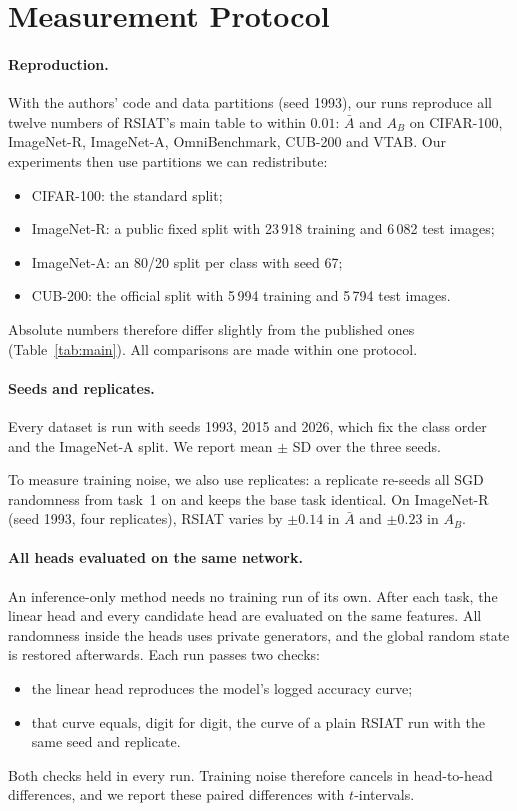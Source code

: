 \section{Measurement Protocol}
\label{sec:protocol}

\paragraph{Reproduction.}
With the authors' code and data partitions (seed 1993), our runs reproduce
all twelve numbers of RSIAT's main table to within $0.01$: $\bar A$ and $A_B$
on CIFAR-100, ImageNet-R, ImageNet-A, OmniBenchmark, CUB-200 and VTAB.
Our experiments then use partitions we can redistribute:
\begin{itemize}
  \item CIFAR-100: the standard split;
  \item ImageNet-R: a public fixed split with 23\,918 training and 6\,082 test images;
  \item ImageNet-A: an 80/20 split per class with seed 67;
  \item CUB-200: the official split with 5\,994 training and 5\,794 test images.
\end{itemize}
Absolute numbers therefore differ slightly from the published ones
(Table~\ref{tab:main}). All comparisons are made within one protocol.

\paragraph{Seeds and replicates.}
Every dataset is run with seeds 1993, 2015 and 2026, which fix the class order
and the ImageNet-A split. We report mean $\pm$ SD over the three seeds.

To measure training noise, we also use replicates: a replicate re-seeds all
SGD randomness from task~1 on and keeps the base task identical. On
ImageNet-R (seed 1993, four replicates), RSIAT varies by $\pm0.14$ in
$\bar A$ and $\pm0.23$ in $A_B$.

\paragraph{All heads evaluated on the same network.}
An inference-only method needs no training run of its own. After each task,
the linear head and every candidate head are evaluated on the same features.
All randomness inside the heads uses private generators, and the global
random state is restored afterwards. Each run passes two checks:
\begin{itemize}
  \item the linear head reproduces the model's logged accuracy curve;
  \item that curve equals, digit for digit, the curve of a plain RSIAT run
    with the same seed and replicate.
\end{itemize}
Both checks held in every run. Training noise therefore cancels in
head-to-head differences, and we report these paired differences with
$t$-intervals.


